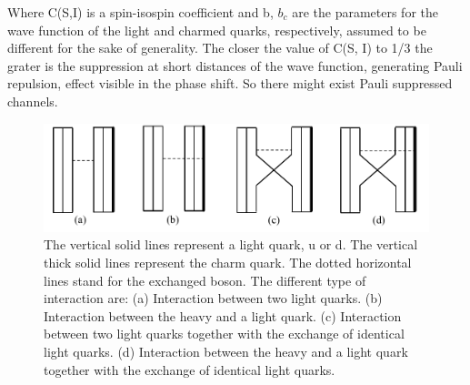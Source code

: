 \documentclass[12pt,a4paper]{book}
\begin{document}
	Where C(S,I) is a spin-isospin coefficient and b, $b_c$ are the parameters for the wave function of the light and charmed quarks, respectively, assumed to be different for the
	sake of generality. The closer the value of C(S, I) to 1/3 the grater is  the suppression at short distances of the wave function, generating Pauli repulsion, effect visible in the phase shift. So there might exist Pauli suppressed channels. 
	
	\begin{figure}[ht]
		\centering
		\includegraphics[width=0.7\linewidth]{pictures/charmed_nucleos_interaction.png}
		\caption{ The vertical solid lines represent a light quark, u or d. The vertical thick solid lines represent the charm quark. The dotted horizontal lines stand for the exchanged boson. The different type of interaction are: (a) Interaction between two light quarks. (b) Interaction between the heavy and a light quark. (c) Interaction between	two light quarks together with the exchange of identical light quarks. (d) Interaction between the	heavy and a light quark together with the exchange of identical light quarks.}
		\label{fig:charmed_nucleos_interaction} 
	\end{figure}
	
\end{document}
